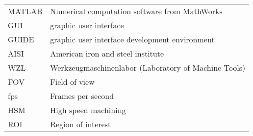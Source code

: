 \begin{longtable}{ll}
MATLAB & Numerical computation software from MathWorks\\
GUI & graphic user interface \\
GUIDE & graphic user interface development environment\\
AISI & American iron and steel institute\\
WZL & Werkzeugmaschinenlabor (Laboratory of Machine Tools)\\
FOV & Field of view\\
fps & Frames per second\\
HSM & High speed machining\\
ROI & Region of interest\\
\end{longtable}

